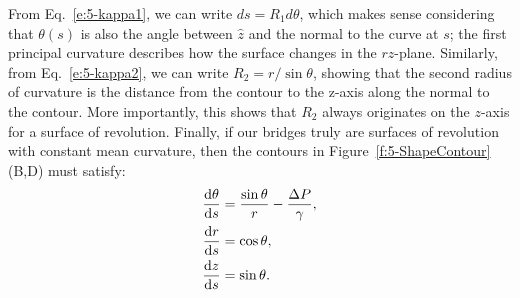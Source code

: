 From Eq.~\ref{e:5-kappa1}, we can write $ds = R_1 d\theta$, which makes sense considering that $\theta(s)$ is also the angle between $\hat{z}$ and the normal to the curve at $s$; the first principal curvature describes how the surface changes in the $rz$-plane.
Similarly, from Eq.~\ref{e:5-kappa2}, we can write $R_2 = r/\sin\theta$, showing that the second radius of curvature is the distance from the contour to the z-axis along the normal to the contour.
More importantly, this shows that $R_2$ always originates on the $z$-axis for a surface of revolution.
Finally, if our bridges truly are surfaces of revolution with constant mean curvature, then the contours in Figure~\ref{f:5-ShapeContour}(B,D) must satisfy:
\begin{align}
  \frac{\textrm{d}\theta}{\textrm{d}s} &= \frac{\sin \theta}{r} - \frac{\Delta P}{\gamma},\label{e:5-ShapeSolveA} \\
  \frac{{\rm d}r}{{\rm d}s} &= \cos \theta, \\
  \frac{{\rm d}{z}}{{\rm d}s} &= \sin \theta.\label{e:5-ShapeSolveC}
\end{align}

